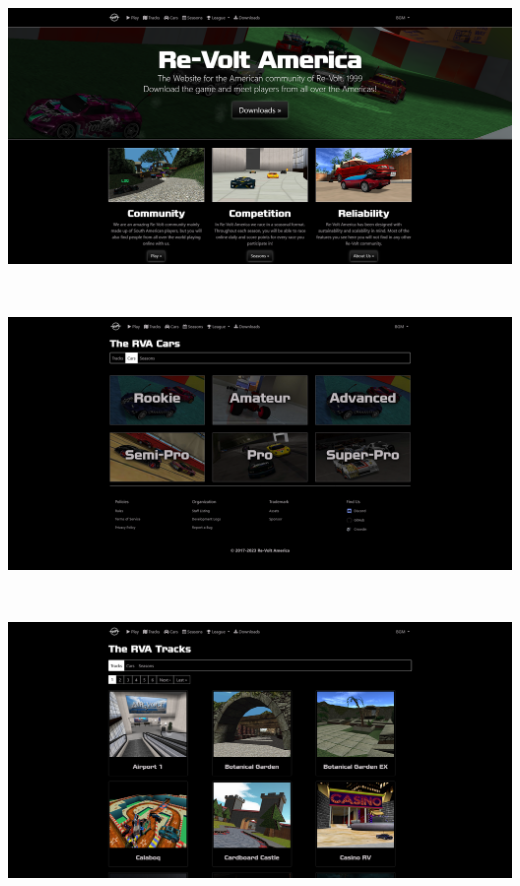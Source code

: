 \includegraphics[width=15cm, height=8cm]{img/landing.png} \\

\includegraphics[width=15cm, height=8cm]{img/cars.png} \\

\includegraphics[width=15cm, height=8cm]{img/tracks.png} \\

